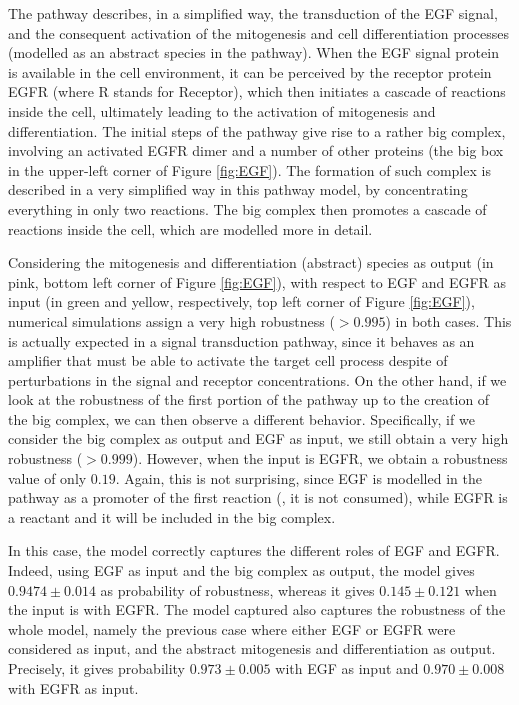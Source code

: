 The pathway describes, in a simplified way, the transduction of the EGF signal, and the consequent activation of the mitogenesis and cell differentiation processes (modelled as an abstract species in the pathway). When the EGF signal protein is available in the cell environment, it can be perceived by the receptor protein EGFR (where R stands for Receptor), which then initiates a cascade of reactions inside the cell, ultimately leading to the activation of mitogenesis and differentiation. The initial steps of the pathway give rise to a rather big complex, involving an activated EGFR dimer and a number of other proteins (the big box in the upper-left corner of Figure \ref{fig:EGF}). The formation of such complex is described in a very simplified way in this pathway model, by concentrating everything in only two reactions. The big complex then promotes a cascade of reactions inside the cell, which are modelled more in detail.

Considering the mitogenesis and differentiation (abstract) species as output (in pink, bottom left corner of Figure \ref{fig:EGF}), with respect to EGF and EGFR as input (in green and yellow, respectively, top left corner of Figure \ref{fig:EGF}), numerical simulations assign a very high robustness ($>0.995$) in both cases. This is actually expected in a signal transduction pathway, since it behaves as an amplifier that must be able to activate the target cell process despite of perturbations in the signal and receptor concentrations. On the other hand, if we look at the robustness of the first portion of the pathway up to the creation of the big complex, we can then observe a different behavior. Specifically, if we consider the big complex as output and EGF as input, we still obtain a very high robustness ($>0.999$). However, when the input is EGFR, we obtain a robustness value of only $0.19$. Again, this is not surprising, since EGF is modelled in the pathway as a promoter of the first reaction (\ie, it is not consumed), while EGFR is a reactant and it will be included in the big complex.

In this case, the model correctly captures the different roles of EGF and EGFR. Indeed, using EGF as input and the big complex as output, the model gives $0.9474 \pm 0.014$ as probability of robustness, whereas it gives $0.145 \pm 0.121$ when the input is with EGFR. The model captured also captures the robustness of the whole model, namely the previous case where either EGF or EGFR were considered as input, and the abstract mitogenesis and differentiation as output. Precisely, it gives probability $0.973 \pm 0.005$ with EGF as input and $0.970 \pm 0.008$ with EGFR as input.

